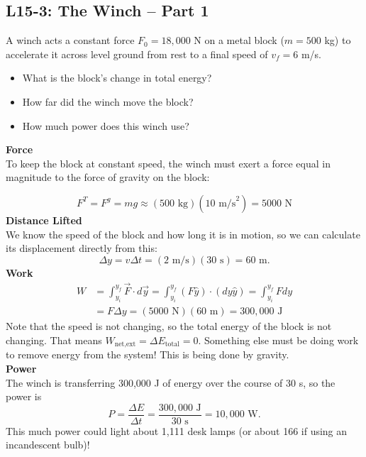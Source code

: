 \documentclass[]{article}
\newcommand{\Week}{15}
\begin{document}
\begin{PresentSpace}
\vspace{-10pt}
\section*{L\Week-3: The Winch -- Part 1}
\vspace{-10pt}
A winch acts a constant force $F_{0}=18,000$ N on a metal block ($m=500$ kg) to accelerate it across level ground from rest to a final speed of $v_{f}=6$ m/s.
\begin{itemize}
	\item What is the block's change in total energy?
	\item How far did the winch move the block?
	\item How much power does this winch use?
\end{itemize}
\end{PresentSpace}
\newpage
\begin{TeacherMargin}
\noindent\textbf{Force} \\
To keep the block at constant speed, the winch must exert a force equal in magnitude to the force of gravity on the block:
\begin{center}
\end{center}
\[
F^{T} = F^{g} = mg \approx (500\text{ kg})(10\text{ m/s}^{2}) = 5000\text{ N}
\]
\textbf{Distance Lifted} \\
We know the speed of the block and how long it is in motion, so we can calculate its displacement directly from this:
\[
\Delta y = v\Delta t = (2\text{ m/s})(30\text{ s}) = 60\text{ m}.
\]
\textbf{Work}
\begin{align*}
	W & = \int_{y_{i}}^{y_{f}}\vec{F}\cdot d\vec{y} = \int_{y_{i}}^{y_{f}}\left(F\hat{y}\right)\cdot\left(dy\hat{y}\right) = \int_{y_{i}}^{y_{f}}Fdy \\
	& = F\Delta y = (5000\text{ N})(60\text{ m}) = 300,000\text{ J}
\end{align*}
Note that the speed is not changing, so the total energy of the block is not changing. That means $W_{\text{net,ext}}=\Delta E_{\text{total}} = 0$. Something else must be doing work to remove energy from the system! This is being done by gravity. \\
\textbf{Power} \\
The winch is transferring 300,000 J of energy over the course of 30 s, so the power is
\[
P = \frac{\Delta E}{\Delta t} = \frac{300,000\text{ J}}{30\text{ s}} = 10,000\text{ W}.
\]
This much power could light about 1,111 desk lamps (or about 166 if using an incandescent bulb)!
\end{TeacherMargin}
\end{document}
